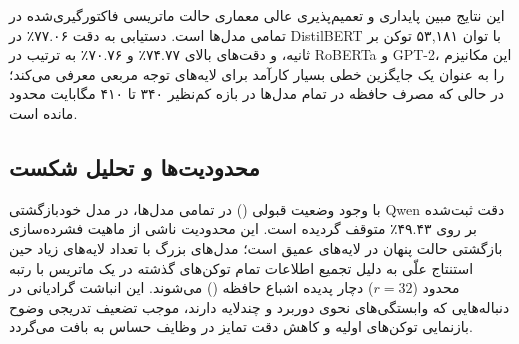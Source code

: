 این نتایج مبین پایداری و تعمیم‌پذیری عالی معماری حالت ماتریسی فاکتورگیری‌شده در تمامی مدل‌ها است. دستیابی به دقت ۷۷.۰۶٪ در DistilBERT با توان ۵۳,۱۸۱ توکن بر ثانیه، و دقت‌های بالای ۷۴.۷۷٪ و ۷۰.۷۶٪ به ترتیب در RoBERTa و GPT-2، این مکانیزم را به عنوان یک جایگزین خطی بسیار کارآمد برای لایه‌های توجه مربعی معرفی می‌کند؛ در حالی که مصرف حافظه در تمام مدل‌ها در بازه کم‌نظیر ۳۴۰ تا ۴۱۰ مگابایت محدود مانده است.

\subsection{محدودیت‌ها و تحلیل شکست}
با وجود وضعیت قبولی () در تمامی مدل‌ها، در مدل خودبازگشتی Qwen دقت ثبت‌شده بر روی ۴۹.۴۳٪ متوقف گردیده است. این محدودیت ناشی از ماهیت فشرده‌سازی بازگشتی حالت پنهان در لایه‌های عمیق است؛ مدل‌های بزرگ با تعداد لایه‌های زیاد حین استنتاج علّی به دلیل تجمیع اطلاعات تمام توکن‌های گذشته در یک ماتریس با رتبه محدود ($r=32$) دچار پدیده اشباع حافظه () می‌شوند. این انباشت گرادیانی در دنباله‌هایی که وابستگی‌های نحوی دوربرد و چندلایه دارند، موجب تضعیف تدریجی وضوح بازنمایی توکن‌های اولیه و کاهش دقت تمایز در وظایف حساس به بافت می‌گردد.
